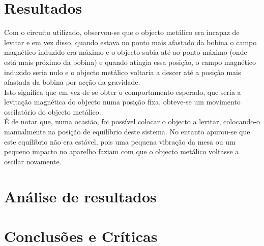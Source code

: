 \documentclass[%
  reprint,
  nofootinbib,
  amsmath,amssymb,
  aps,
  10pt,
  a4paper
]{revtex4-1}
\begin{document}
\section{Resultados}
\label{s:resul}
Com o circuito utilizado, observou-se que o objecto metálico era incapaz de levitar e em vez disso, quando estava no ponto mais afastado da bobina o campo magnético induzido era máximo e o objecto subia até ao ponto máximo (onde está mais próximo da bobina) e quando atingia essa posição, o campo magnético induzido seria nulo e o objecto metálico voltaria a descer até a posição mais afastada da bobina por acção da gravidade.\\
Isto significa que em vez de se obter o comportamento esperado, que seria a levitação magnética do objecto numa posição fixa, obteve-se um movimento oscilatório do objecto metálico.\\
É de notar que, numa ocasião, foi possível colocar o objecto a levitar, colocando-o manualmente na posição de equilíbrio deste sistema. No entanto apurou-se que este equílibrio não era estável, pois uma pequena vibração da mesa ou um pequeno impacto no aparelho faziam com que o objecto metálico voltasse a oscilar novamente.\\





\section{Análise de resultados}
\label{s:aresul}





\section{Conclusões e Críticas}
\label{s:conclu}







\nocite{*}
{}
\end{document}

